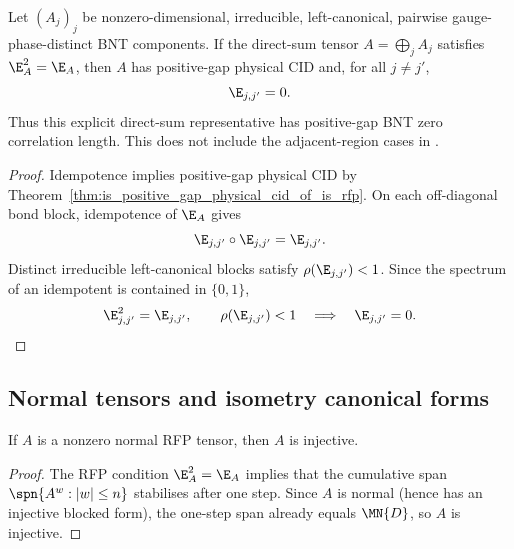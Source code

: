 \begin{theorem}%
    \label{thm:is_positive_gap_bnt_zcl_of_is_rfp_direct_sum}
    \leanok
    Let $(A_j)_j$ be nonzero-dimensional, irreducible, left-canonical,
    pairwise gauge-phase-distinct BNT components.  If the direct-sum tensor
    $A=\bigoplus_j A_j$ satisfies $\E_A^2=\E_A$, then $A$ has positive-gap
    physical CID and, for all $j\ne j'$,
    \[
        \E_{j,j'}=0.
    \]
    Thus this explicit direct-sum representative has positive-gap BNT zero
    correlation length.  This does not include the adjacent-region cases in
    \cite[Theorem~3.8]{Cirac2016MPDO_arXiv}.
\end{theorem}
\begin{proof}\leanok
    Idempotence implies positive-gap physical CID by
    Theorem~\ref{thm:is_positive_gap_physical_cid_of_is_rfp}.  On each
    off-diagonal bond block, idempotence of $\E_A$ gives
    \[
        \E_{j,j'}\circ\E_{j,j'}=\E_{j,j'}.
    \]
    Distinct irreducible left-canonical blocks satisfy
    $\rho(\E_{j,j'})<1$.  Since the spectrum of an idempotent is contained in
    $\{0,1\}$,
    \[
        \E_{j,j'}^2=\E_{j,j'},\qquad
        \rho(\E_{j,j'})<1
        \quad\Longrightarrow\quad
        \E_{j,j'}=0.
    \]
\end{proof}

\subsection{Normal tensors and isometry canonical forms}

\begin{theorem}\label{thm:rfp_nt_injective}
    \leanok
    If $A$ is a nonzero normal RFP tensor, then $A$ is injective.
\end{theorem}
\begin{proof}\leanok
    The RFP condition $\E_A^2 = \E_A$ implies that the cumulative span
    $\spn\{A^w : |w| \le n\}$ stabilises after one step.
    Since $A$ is normal (hence has an injective blocked form),
    the one-step span already equals $\MN{D}$, so $A$ is injective.
\end{proof}

